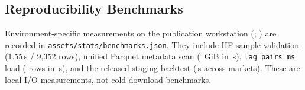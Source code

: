 \subsection{Reproducibility Benchmarks}
\label{sec:exp-bench}

Environment-specific measurements on the publication workstation
(\OpenMarketHardware{}; \OpenMarketRustVersion{}) are recorded in
\texttt{assets/stats/benchmarks.json}. They include HF sample validation
(1.55\,s / 9{,}352 rows), unified Parquet metadata scan
(\OpenMarketUnifiedGiB{}~GiB in \OpenMarketUnifiedMetaScanSeconds{}\,s),
\texttt{lag\_pairs\_ms} load (\OpenMarketLagPairs{} rows in
\OpenMarketLagPairsLoadSeconds{}\,s), and the released staging backtest
(\OpenMarketBenchBacktest{}\,s across \OpenMarketBenchBacktestMarkets{}
markets). These are local I/O measurements, not cold-download benchmarks.
